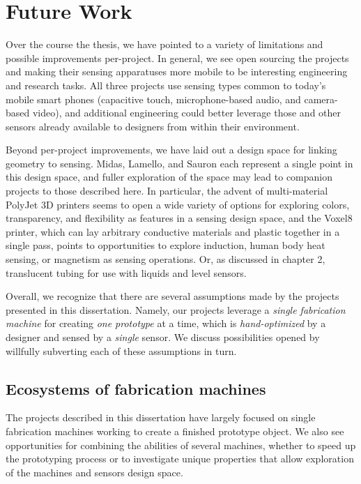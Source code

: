 \section{Future Work}

Over the course the thesis, we have pointed to a variety of limitations and possible improvements per-project. In general, we see open sourcing the projects and making their sensing apparatuses more mobile to be interesting engineering and research tasks. All three projects use sensing types common to today's mobile smart phones (capacitive touch, microphone-based audio, and camera-based video), and additional engineering could better leverage those and other sensors already available to designers from within their environment.

Beyond per-project improvements, we have laid out a design space for linking geometry to sensing. Midas, Lamello, and Sauron each represent a single point in this design space, and fuller exploration of the space may lead to companion projects to those described here. In particular, the advent of multi-material PolyJet 3D printers seems to open a wide variety of options for exploring colors, transparency, and flexibility as features in a sensing design space, and the Voxel8 \cite{voxel8} printer, which can lay arbitrary conductive materials and plastic together in a single pass, points to opportunities to explore induction, human body heat sensing, or magnetism as sensing operations. Or, as discussed in chapter 2, translucent tubing for use with liquids and level sensors.

Overall, we recognize that there are several assumptions made by the projects presented in this dissertation. Namely, our projects leverage a \emph{single fabrication machine} for creating \emph{one prototype} at a time, which is \emph{hand-optimized} by a designer and sensed by a \emph{single} sensor. We discuss possibilities opened by willfully subverting each of these assumptions in turn.

\subsection{Ecosystems of fabrication machines}

The projects described in this dissertation have largely focused on single fabrication machines working to create a finished prototype object. We also see opportunities for combining the abilities of several machines, whether to speed up the prototyping process or to investigate unique properties that allow exploration of the machines and sensors design space.

